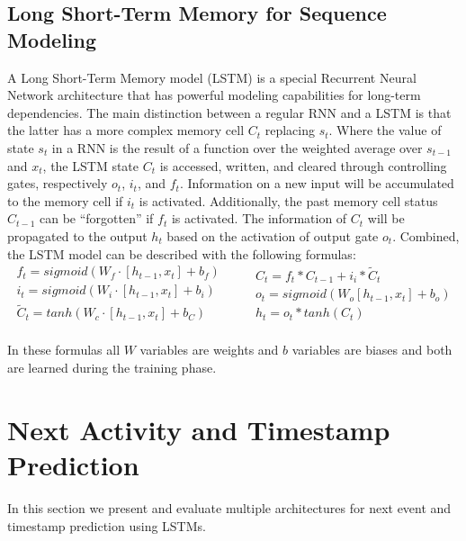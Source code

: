 \documentclass[runningheads,a4paper]{llncs}
\begin{document}
\subsection{Long Short-Term Memory for Sequence Modeling}
A Long Short-Term Memory model (LSTM) \cite{Hochreiter1997} is a special Recurrent Neural Network architecture that has powerful modeling capabilities for long-term dependencies. The main distinction between a regular RNN and a LSTM is that the latter has a more complex memory cell $C_t$ replacing $s_t$. Where the value of state $s_t$ in a RNN is the result of a function over the weighted average over $s_{t-1}$ and $x_t$, the LSTM state $C_t$ is accessed, written, and cleared through controlling gates, respectively $o_t$, $i_t$, and $f_t$. Information on a new input will be accumulated to the memory cell if $i_t$ is activated. Additionally, the past memory cell status $C_{t-1}$ can be ``forgotten'' if $f_t$ is activated. The information of $C_t$ will be propagated to the output $h_t$ based on the activation of output gate $o_t$. Combined, the LSTM model can be described with the following formulas:\\
\begin{equation*}
\begin{split}
f_t=\mathit{sigmoid}(W_f\cdot[h_{t-1},x_t]+b_f)\\
i_t=\mathit{sigmoid}(W_i\cdot[h_{t-1},x_t]+b_i)\\
\tilde{C}_t=\mathit{tanh}(W_c\cdot[h_{t-1},x_t]+b_{C})\\
\end{split}
\qquad
\begin{split}
C_t=f_t*C_{t-1}+i_i*\tilde{C}_t\\
o_t=\mathit{sigmoid}(W_o[h_{t-1},x_t]+b_o)\\
h_t=o_t*\mathit{tanh}(C_t)\\
\end{split}
\end{equation*}

In these formulas all $W$ variables are weights and $b$ variables are biases and both are learned during the training phase. 
\section{Next Activity and Timestamp Prediction}
\label{sec:next_activity}
In this section we present and evaluate multiple architectures for next event and timestamp prediction using LSTMs.
\end{document}
